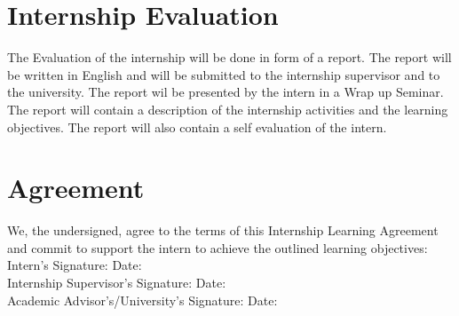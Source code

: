 \documentclass{article}
\begin{document}
\section{Internship Evaluation}
The Evaluation of the internship will be done in form of a report. The report will be written in English and will be submitted to the internship supervisor and to the university. The report wil be presented by the intern in a Wrap up Seminar. The report will contain a description of the internship activities and the learning objectives. The report will also contain a self evaluation of the intern. 

\section{Agreement}

We, the undersigned, agree to the terms of this Internship Learning Agreement and commit to support the intern to achieve the outlined learning objectives:
\\

Intern's Signature: \hspace{3cm} Date: 
\\

Internship Supervisor's Signature: \hspace{3cm} Date:
\\

Academic Advisor's/University's Signature: \hspace{3cm} Date:
\\
\end{document}
